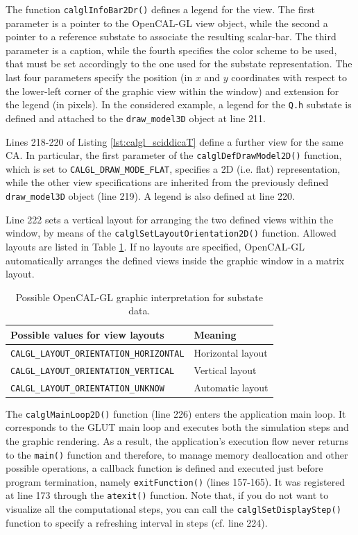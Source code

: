 The function \verb'calglInfoBar2Dr()' defines a legend for the
view. The first parameter is a pointer to the OpenCAL-GL view object,
while the second a pointer to a reference substate to associate the
resulting scalar-bar. The third parameter is a caption, while the
fourth specifies the color scheme to be used, that must be set
accordingly to the one used for the substate representation. The last
four parameters specify the position (in $x$ and $y$ coordinates with
respect to the lower-left corner of the graphic view within the
window) and extension for the legend (in pixels). In the considered
example, a legend for the \verb'Q.h' substate is defined and attached
to the \verb'draw_model3D' object at line 211.

Lines 218-220 of Listing \ref{lst:calgl_sciddicaT} define a further
view for the same CA. In particular, the first parameter of the
\verb'calglDefDrawModel2D()' function, which is set to
\verb'CALGL_DRAW_MODE_FLAT', specifies a 2D (i.e. flat)
representation, while the other view specifications are inherited from
the previously defined \verb'draw_model3D' object (line 219). A legend
is also defined at line 220.

Line 222 sets a vertical layout for arranging the two defined views
within the window, by means of the
\verb'calglSetLayoutOrientation2D()' function. Allowed layouts are
listed in Table \ref{tab:calgl_layouts}. If no layouts are specified,
OpenCAL-GL automatically arranges the defined views inside the graphic
window in a matrix layout.

\begin{table}
  \centering
  \small
  \begin{tabular}{l|l}
    \hline
    Possible values for view layouts & Meaning\\
    \hline
    \verb'CALGL_LAYOUT_ORIENTATION_HORIZONTAL' & Horizontal layout\\
    \verb'CALGL_LAYOUT_ORIENTATION_VERTICAL'   & Vertical layout\\
    \verb'CALGL_LAYOUT_ORIENTATION_UNKNOW'     & Automatic layout\\
    \hline
  \end{tabular}
  \caption{Possible OpenCAL-GL graphic interpretation for substate data.}
  \label{tab:calgl_layouts}
\end{table}

The \verb'calglMainLoop2D()' function (line 226) enters the
application main loop. It corresponds to the GLUT main loop and
executes both the simulation steps and the graphic rendering. As a
result, the application's execution flow never returns to the
\verb'main()' function and therefore, to manage memory deallocation
and other possible operations, a callback function is defined and
executed just before program termination, namely \verb'exitFunction()'
(lines 157-165). It was registered at line 173 through the
\verb'atexit()' function. Note that, if you do not want to visualize all
the computational steps, you can call the \verb'calglSetDisplayStep()'
function to specify a refreshing interval in steps (cf. line 224).

